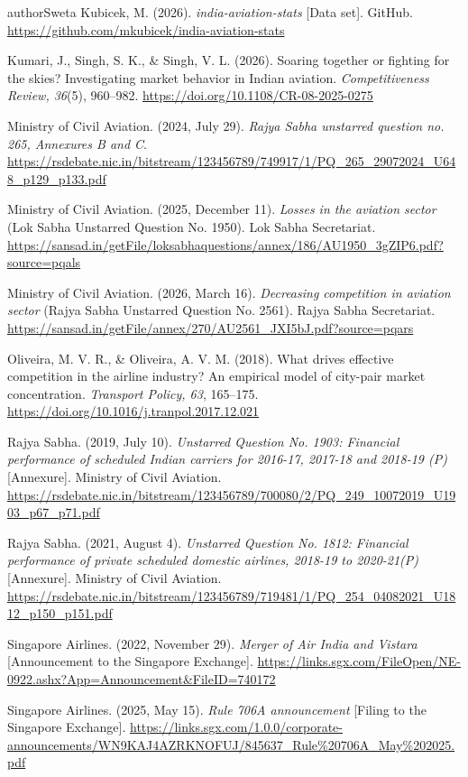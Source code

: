 \begin{mergedcontribution}{authorSweta}
Kubicek, M. (2026). \textit{india-aviation-stats} [Data set]. GitHub. \url{https://github.com/mkubicek/india-aviation-stats}

Kumari, J., Singh, S. K., \& Singh, V. L. (2026). Soaring together or fighting for the skies? Investigating market behavior in Indian aviation. \textit{Competitiveness Review, 36}(5), 960--982. \url{https://doi.org/10.1108/CR-08-2025-0275}

Ministry of Civil Aviation. (2024, July 29). \textit{Rajya Sabha unstarred question no. 265, Annexures B and C}. \url{https://rsdebate.nic.in/bitstream/123456789/749917/1/PQ_265_29072024_U648_p129_p133.pdf}

Ministry of Civil Aviation. (2025, December 11). \textit{Losses in the aviation sector} (Lok Sabha Unstarred Question No. 1950). Lok Sabha Secretariat. \url{https://sansad.in/getFile/loksabhaquestions/annex/186/AU1950_3gZIP6.pdf?source=pqals}

Ministry of Civil Aviation. (2026, March 16). \textit{Decreasing competition in aviation sector} (Rajya Sabha Unstarred Question No. 2561). Rajya Sabha Secretariat. \url{https://sansad.in/getFile/annex/270/AU2561_JXI5bJ.pdf?source=pqars}

Oliveira, M. V. R., \& Oliveira, A. V. M. (2018). What drives effective competition in the airline industry? An empirical model of city-pair market concentration. \textit{Transport Policy, 63}, 165--175. \url{https://doi.org/10.1016/j.tranpol.2017.12.021}

Rajya Sabha. (2019, July 10). \textit{Unstarred Question No. 1903: Financial performance of scheduled Indian carriers for 2016-17, 2017-18 and 2018-19 (P)} [Annexure]. Ministry of Civil Aviation. \url{https://rsdebate.nic.in/bitstream/123456789/700080/2/PQ_249_10072019_U1903_p67_p71.pdf}

Rajya Sabha. (2021, August 4). \textit{Unstarred Question No. 1812: Financial performance of private scheduled domestic airlines, 2018-19 to 2020-21(P)} [Annexure]. Ministry of Civil Aviation. \url{https://rsdebate.nic.in/bitstream/123456789/719481/1/PQ_254_04082021_U1812_p150_p151.pdf}

Singapore Airlines. (2022, November 29). \textit{Merger of Air India and Vistara} [Announcement to the Singapore Exchange]. \url{https://links.sgx.com/FileOpen/NE-0922.ashx?App=Announcement&FileID=740172}

Singapore Airlines. (2025, May 15). \textit{Rule 706A announcement} [Filing to the Singapore Exchange]. \url{https://links.sgx.com/1.0.0/corporate-announcements/WN9KAJ4AZRKNOFUJ/845637_Rule\%20706A_May\%202025.pdf}


\end{mergedcontribution}

